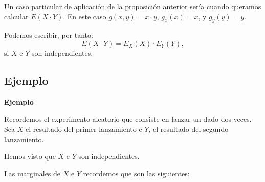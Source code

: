 \documentclass[]{book}
\begin{document}
Un caso particular de aplicación de la proposición anterior sería cuando queramos calcular \(E(X\cdot Y)\). En este caso \(g(x,y)=x\cdot y\), \(g_x(x)=x\), y \(g_y(y)=y\).

Podemos escribir, por tanto:
\[
E(X\cdot Y)=E_X(X)\cdot E_Y(Y),
\]
si \(X\) e \(Y\) son independientes.

\hypertarget{ejemplo-60}{%
\subsection{Ejemplo}\label{ejemplo-60}}

\textbf{Ejemplo}

Recordemos el experimento aleatorio que consiste en lanzar un dado dos veces. Sea \(X\) el resultado del primer lanzamiento e \(Y\), el resultado del segundo lanzamiento.

Hemos visto que \(X\) e \(Y\) son independientes.

Las marginales de \(X\) e \(Y\) recordemos que son las siguientes:
\end{document}
